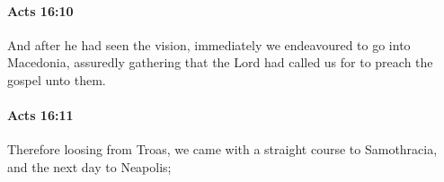 		\paragraph{Acts 16:10} %
			\label{ACTS-16-10}

			And after he had seen the vision, immediately we endeavoured to go into Macedonia, assuredly gathering that the Lord had called us for to preach the gospel unto them.

			\begin{framed}
			\scriptsize
				\begin{compactdesc}
					\item[SBLG] 
				\end{compactdesc}
			\end{framed}

		\paragraph{Acts 16:11} %
			\label{ACTS-16-11}

			Therefore loosing from Troas, we came with a straight course to Samothracia, and the next day to Neapolis;

